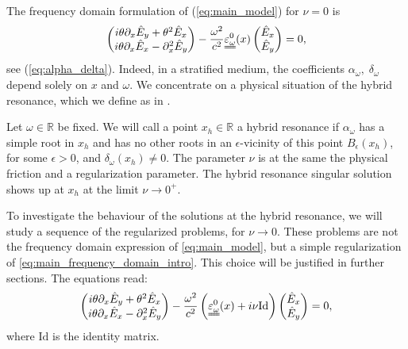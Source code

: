 The frequency domain formulation of (\ref{eq:main_model}) for $\nu=0$ is
\begin{align}
\label{eq:main_frequency_domain_intro}
\left(
\begin{matrix}
 i\theta \partial_x \hat{E}_y+\theta^2 \hat{E}_x\\
 i\theta \partial_x \hat{E}_x -\partial_x^2 \hat{E}_y
\end{matrix}
\right)-\frac{\omega^2}{c^2}
\uuline{\varepsilon_{\omega}^{0}}(x)\left(
\begin{matrix}
 \hat{E}_x\\
 \hat{E}_y
\end{matrix}
\right)
=0,
\end{align}
see (\ref{eq:alpha_delta}). Indeed, in a stratified medium, the coefficients $\alpha_{\omega},\;\delta_{\omega}$ depend solely on $x$ and $\omega$. We concentrate on a physical situation of the hybrid resonance, which we define as in \cite{singular_solutions}.
\begin{df}
Let $\omega\in\mathbb{R}$ be fixed.
We will call a point $x_h\in \mathbb{R}$ a hybrid resonance if $\alpha_{\omega}$ has
a simple root in $x_h$ and has no other roots in an $\epsilon$-vicinity of this point $B_{\epsilon}(x_h)$, for some $\epsilon>0$,
and $\delta_{\omega}(x_h)\neq 0$.
The parameter $\nu$ is at the same the physical friction and a regularization parameter. The hybrid resonance singular solution
shows up at $x_h$ at the limit $\nu\rightarrow 0^+$.
\end{df}
To investigate the behaviour of the solutions at the hybrid resonance, 
we will study a sequence of the regularized problems, for $\nu\rightarrow 0$. These problems are not the frequency domain expression of \eqref{eq:main_model}, but a simple regularization of \eqref{eq:main_frequency_domain_intro}. This choice will be justified in further sections. The equations read: 
\begin{align}
\label{eq:seq_regularized}
\left(
\begin{matrix}
 i\theta \partial_x \hat{E}_y+\theta^2 \hat{E}_x\\
 i\theta \partial_x \hat{E}_x -\partial_x^2 \hat{E}_y
\end{matrix}
\right)-\frac{\omega^2}{c^2}
\left(\uuline{\varepsilon_{\omega}^{0}}(x)+i\nu \mathrm{Id}\right)\left(
\begin{matrix}
 \hat{E}_x\\
 \hat{E}_y
\end{matrix}
\right)
=0,
\end{align}
where $\mathrm{Id}$ is the identity matrix. 

